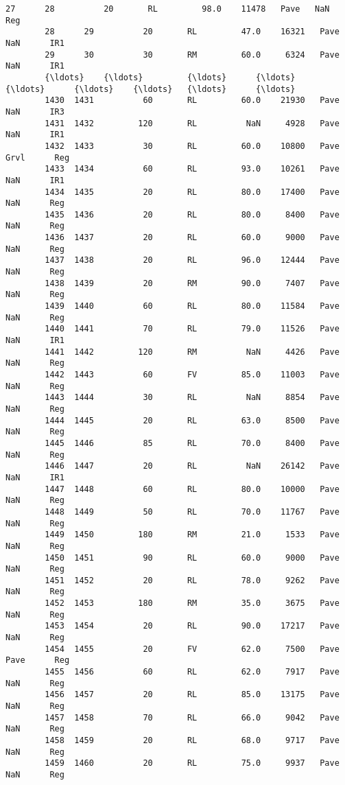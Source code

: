 \documentclass[11pt]{article}
\begin{document}
\begin{Verbatim}[commandchars=\\\{\}]
        27      28          20       RL         98.0    11478   Pave   NaN      Reg   
        28      29          20       RL         47.0    16321   Pave   NaN      IR1   
        29      30          30       RM         60.0     6324   Pave   NaN      IR1   
        {\ldots}    {\ldots}         {\ldots}      {\ldots}          {\ldots}      {\ldots}    {\ldots}   {\ldots}      {\ldots}   
        1430  1431          60       RL         60.0    21930   Pave   NaN      IR3   
        1431  1432         120       RL          NaN     4928   Pave   NaN      IR1   
        1432  1433          30       RL         60.0    10800   Pave  Grvl      Reg   
        1433  1434          60       RL         93.0    10261   Pave   NaN      IR1   
        1434  1435          20       RL         80.0    17400   Pave   NaN      Reg   
        1435  1436          20       RL         80.0     8400   Pave   NaN      Reg   
        1436  1437          20       RL         60.0     9000   Pave   NaN      Reg   
        1437  1438          20       RL         96.0    12444   Pave   NaN      Reg   
        1438  1439          20       RM         90.0     7407   Pave   NaN      Reg   
        1439  1440          60       RL         80.0    11584   Pave   NaN      Reg   
        1440  1441          70       RL         79.0    11526   Pave   NaN      IR1   
        1441  1442         120       RM          NaN     4426   Pave   NaN      Reg   
        1442  1443          60       FV         85.0    11003   Pave   NaN      Reg   
        1443  1444          30       RL          NaN     8854   Pave   NaN      Reg   
        1444  1445          20       RL         63.0     8500   Pave   NaN      Reg   
        1445  1446          85       RL         70.0     8400   Pave   NaN      Reg   
        1446  1447          20       RL          NaN    26142   Pave   NaN      IR1   
        1447  1448          60       RL         80.0    10000   Pave   NaN      Reg   
        1448  1449          50       RL         70.0    11767   Pave   NaN      Reg   
        1449  1450         180       RM         21.0     1533   Pave   NaN      Reg   
        1450  1451          90       RL         60.0     9000   Pave   NaN      Reg   
        1451  1452          20       RL         78.0     9262   Pave   NaN      Reg   
        1452  1453         180       RM         35.0     3675   Pave   NaN      Reg   
        1453  1454          20       RL         90.0    17217   Pave   NaN      Reg   
        1454  1455          20       FV         62.0     7500   Pave  Pave      Reg   
        1455  1456          60       RL         62.0     7917   Pave   NaN      Reg   
        1456  1457          20       RL         85.0    13175   Pave   NaN      Reg   
        1457  1458          70       RL         66.0     9042   Pave   NaN      Reg   
        1458  1459          20       RL         68.0     9717   Pave   NaN      Reg   
        1459  1460          20       RL         75.0     9937   Pave   NaN      Reg   
        

\end{Verbatim}
\end{document}
